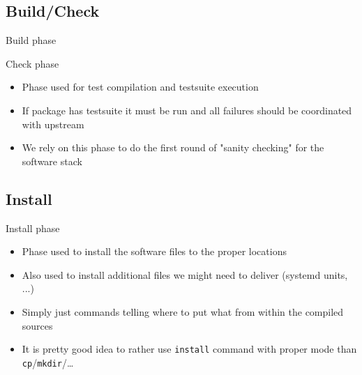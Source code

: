 \documentclass{beamer}
\begin{document}
\subsection{Build/Check}

\begin{frame}[fragile]{Build phase}
\end{frame}

\begin{frame}[t]{Check phase}
	\begin{itemize}
	\item Phase used for test compilation and testsuite execution
    \item If package has testsuite it must be run and all failures should be coordinated with upstream
    \item We rely on this phase to do the first round of "sanity checking" for the software stack
	\end{itemize}
\end{frame}

\subsection{Install}

\begin{frame}[t]{Install phase}
	\begin{itemize}
	\item Phase used to install the software files to the proper locations
    \item Also used to install additional files we might need to deliver (systemd units, ...)
    \item Simply just commands telling where to put what from within the compiled sources
    \item It is pretty good idea to rather use \texttt{install} command with proper mode than \texttt{cp}/\texttt{mkdir}/\ldots
	\end{itemize}
\end{frame}
\end{document}
